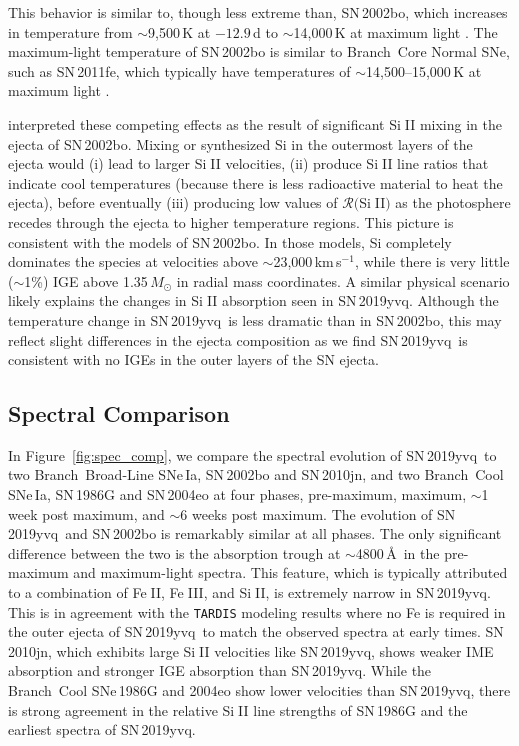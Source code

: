 \documentclass[twocolumn]{aastex63}
\def\ion#1#2{#1$\;${\footnotesize\rm{#2}}\relax}
\newcommand{\kms}{km\,s$^{-1}$}
\newcommand{\sn}{SN\,2019yvq}
\begin{document}
This behavior is similar to, though less extreme than, SN\,2002bo, which
increases in temperature from $\sim$9,500\,K at $-12.9$\,d to $\sim$14,000\,K
at maximum light \citep{Stehle05}. The maximum-light temperature of SN\,2002bo
is similar to Branch~Core Normal SNe, such as SN\,2011fe, which
typically have temperatures of $\sim$14,500--15,000\,K at maximum light
\citep{Mazzali14}.

\citet{Benetti04} interpreted these competing effects as the result of
significant \ion{Si}{II} mixing in the ejecta of SN\,2002bo. Mixing or
synthesized Si in the outermost layers of the ejecta would (i) lead to larger
\ion{Si}{II} velocities, (ii) produce \ion{Si}{II} line ratios that indicate
cool temperatures (because there is less radioactive material to heat the
ejecta), before eventually (iii) producing low values of
$\mathcal{R}($\ion{Si}{II}$)$ as the photosphere recedes through the ejecta to
higher temperature regions. This picture is consistent with the
\citet{Stehle05} models of SN\,2002bo. In those models, Si completely
dominates the species at velocities above $\sim$23,000\,\kms, while there is
very little ($\sim$1\%) IGE above 1.35\,$M_\odot$ in radial mass
coordinates. A similar physical scenario likely explains the changes in
\ion{Si}{II} absorption seen in \sn. Although the temperature change in \sn\
is less dramatic than in SN\,2002bo, this may reflect slight differences in
the ejecta composition as we find \sn\ is consistent with no IGEs in the outer
layers of the SN ejecta.

\subsection{Spectral Comparison}\label{sec:spec_comp}

In Figure~\ref{fig:spec_comp}, we compare the spectral evolution of \sn\ to
two Branch~Broad-Line SNe\,Ia, SN\,2002bo and SN\,2010jn, and two Branch~Cool
SNe\,Ia, SN\,1986G and SN\,2004eo \citep{Cristiani92,
Benetti04,Pastorello07,Silverman11,Hachinger13,Maguire14} at four phases,
pre-maximum, maximum, $\sim$1 week post maximum, and $\sim$6 weeks post
maximum. The evolution of \sn\ and SN\,2002bo is remarkably similar at all
phases. The only significant difference between the two is the absorption
trough at $\sim$4800\,\AA\ in the pre-maximum and maximum-light spectra. This
feature, which is typically attributed to a combination of \ion{Fe}{II},
\ion{Fe}{III}, and \ion{Si}{II}, is extremely narrow in \sn. This is in
agreement with the \texttt{TARDIS} modeling results where no Fe is required in
the outer ejecta of \sn\ to match the observed spectra at early times.
SN\,2010jn, which exhibits large \ion{Si}{II} velocities like \sn, shows
weaker IME absorption and stronger IGE absorption than \sn. While the
Branch~Cool SNe\,1986G and 2004eo show lower velocities than \sn, there is
strong agreement in the relative \ion{Si}{II} line strengths of SN\,1986G and
the earliest spectra of \sn.
\end{document}
